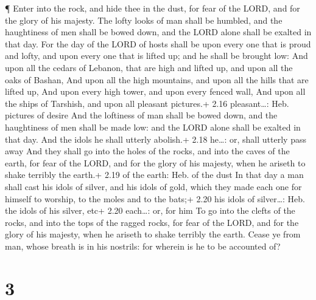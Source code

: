  ¶ Enter into the rock, and hide thee in the dust, for fear
of the LORD, and for the glory of his majesty.  The lofty
looks of man shall be humbled, and the haughtiness of men shall be bowed
down, and the LORD alone shall be exalted in that day.  For
the day of the LORD of hosts shall be upon every one that is proud and
lofty, and upon every one that is lifted up; and he shall be brought
low:  And upon all the cedars of Lebanon, that are high and
lifted up, and upon all the oaks of Bashan,  And upon all
the high mountains, and upon all the hills that are lifted up,
 And upon every high tower, and upon every fenced wall,
 And upon all the ships of Tarshish, and upon all pleasant
pictures.+ 2.16 pleasant\ldots: Heb. pictures of desire 
And the loftiness of man shall be bowed down, and the haughtiness of men
shall be made low: and the LORD alone shall be exalted in that day.
 And the idols he shall utterly abolish.+ 2.18 he\ldots:
or, shall utterly pass away  And they shall go into the
holes of the rocks, and into the caves of the earth, for fear of the
LORD, and for the glory of his majesty, when he ariseth to shake
terribly the earth.+ 2.19 of the earth: Heb. of the dust 
In that day a man shall cast his idols of silver, and his idols of gold,
which they made each one for himself to worship, to the moles and to the
bats;+ 2.20 his idols of silver\ldots: Heb. the idols of his silver,
etc+ 2.20 each\ldots: or, for him  To go into the clefts of
the rocks, and into the tops of the ragged rocks, for fear of the LORD,
and for the glory of his majesty, when he ariseth to shake terribly the
earth.  Cease ye from man, whose breath is in his nostrils:
for wherein is he to be accounted of?

\hypertarget{section-2}{%
\section{3}\label{section-2}}

